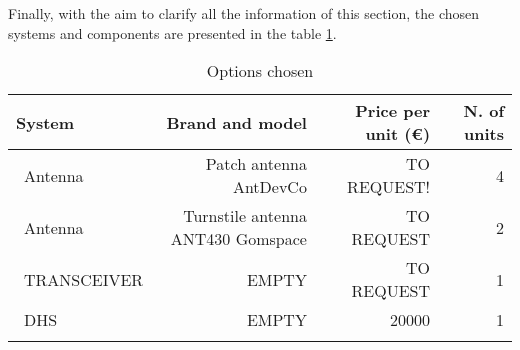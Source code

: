 Finally, with the aim to clarify all the information of this section, the chosen systems and components are presented in the table \ref{payloadchosen}.

\begin{longtable}{| l | r | r | r |}
	\hline
	\rowcolor[gray]{0.80}	\textbf{System} &  \textbf{Brand and model}     & \textbf{Price per unit (\euro)} & \textbf{N. of units}  \\
	\hline
	\endfirsthead
	
	~Antenna & Patch antenna AntDevCo & TO REQUEST! & 4 \\
	~Antenna & Turnstile antenna ANT430 Gomspace & TO REQUEST & 2 \\
	~TRANSCEIVER & EMPTY & TO REQUEST & 1 \\
	~DHS & EMPTY & 20000 & 1 \\
	\hline
	
\caption{Options chosen}
\label{payloadchosen}
\end{longtable}

